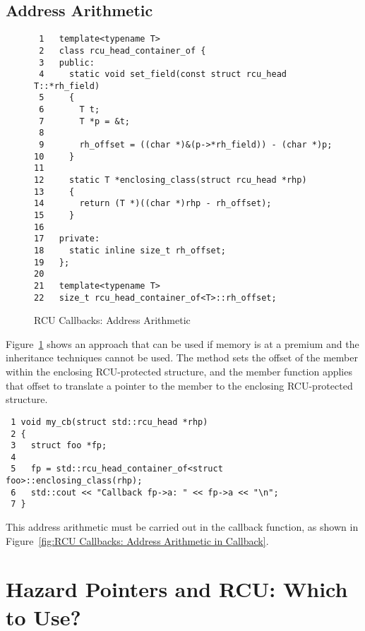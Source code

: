 \documentclass[letterpaper,10pt]{article}
\begin{document}
\subsection{Address Arithmetic}
\label{sec:Address Arithmetic}

\begin{figure}[tbp]
{ \scriptsize
\begin{verbatim}
 1   template<typename T>
 2   class rcu_head_container_of {
 3   public:
 4     static void set_field(const struct rcu_head T::*rh_field)
 5     {
 6       T t;
 7       T *p = &t;
 8
 9       rh_offset = ((char *)&(p->*rh_field)) - (char *)p;
10     }
11
12     static T *enclosing_class(struct rcu_head *rhp)
13     {
14       return (T *)((char *)rhp - rh_offset);
15     }
16
17   private:
18     static inline size_t rh_offset;
19   };
20
21   template<typename T>
22   size_t rcu_head_container_of<T>::rh_offset;
\end{verbatim}
}
\caption{RCU Callbacks: Address Arithmetic}
\label{fig:RCU Callbacks: Address Arithmetic}
\end{figure}

Figure~\ref{fig:RCU Callbacks: Address Arithmetic}
shows an approach that can be used if memory is at a premium and
the inheritance techniques cannot be used.
The  method sets the offset of the
 member within the enclosing RCU-protected
structure, and the  member function
applies that offset to translate a pointer to the
 member to the enclosing RCU-protected structure.

\begin{figure*}[tbp]
{ \scriptsize
\begin{verbatim}
 1 void my_cb(struct std::rcu_head *rhp)
 2 {
 3   struct foo *fp;
 4
 5   fp = std::rcu_head_container_of<struct foo>::enclosing_class(rhp);
 6   std::cout << "Callback fp->a: " << fp->a << "\n";
 7 }
\end{verbatim}
}
\caption{RCU Callbacks: Address Arithmetic in Callback}
\label{fig:RCU Callbacks: Address Arithmetic in Callback}
\end{figure*}

This address arithmetic must be carried out in the callback function,
as shown in
Figure~\ref{fig:RCU Callbacks: Address Arithmetic in Callback}.

\section{Hazard Pointers and RCU: Which to Use?}
\label{sec:Hazard Pointers and RCU: Which to Use?}
\end{document}
